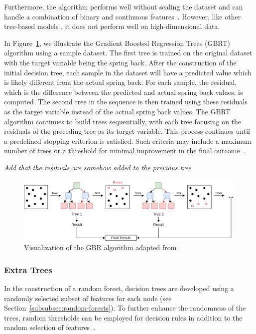 Furthermore, the algorithm performs well without scaling the dataset and can handle a combination of binary and
continuous features~\cite[p. 88--89]{muller_introductionmachinelearning_2016}. However, like other tree-based models
, it does not perform well on high-dimensional data.

In Figure~\ref{fig:gbr-example}, we illustrate the Gradient Boosted Regression Trees (GBRT) algorithm using a sample
dataset.
The first tree is trained on the original dataset with the target variable being the spring back. After the
construction of the initial decision tree, each sample in the dataset will have a predicted value which is likely
different from the actual spring back.
For each sample, the residual, which is the difference between the predicted and actual spring back values, is
computed.
The second tree in the sequence is then trained using these residuals as the target variable instead of the
actual spring back values.
The GBRT algorithm continues to build trees sequentially, with each tree focusing on the residuals of the preceding
tree as its target variable.
This process continues until a predefined stopping criterion is satisfied. Such criteria
may include a maximum number of trees or a threshold for minimal improvement in the final
outcome~\cite[p. 227]{boehmke2019hands}.

\textit{Add that the resituals are somehow added to the previous tree}

\begin{figure}[h]
    \begin{tcolorbox}[arc=0pt,boxrule=0.5pt]
        \centering
        \includegraphics[width=1\textwidth]{chap4/images/gradient_boosting_example}
    \end{tcolorbox}
    \caption{Visualization of the \ac{GBR} algorithm adapted from~\cite[p. 222]{boehmke2019hands}}
    \label{fig:gbr-example}
\end{figure}

\subsubsection{Extra Trees}\label{subsubsec:extra-trees}
In the construction of a random forest, decision trees are developed using a randomly selected subset of features for
each node (see Section~\ref{subsubsec:random-forests}). To further enhance the randomness of the trees, random
thresholds can be employed for decision rules in addition to the random selection of
features~\cite[p. 351]{geron2022hands}.

